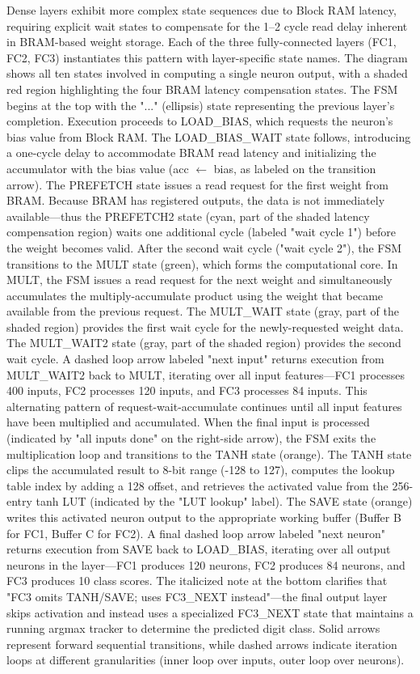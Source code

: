 \documentclass[12pt,a4paper]{report}
\begin{document}
Dense layers exhibit more complex state sequences due to Block RAM latency, requiring explicit wait states to compensate for the 1--2 cycle read delay inherent in BRAM-based weight storage. Each of the three fully-connected layers (FC1, FC2, FC3) instantiates this pattern with layer-specific state names. The diagram shows all ten states involved in computing a single neuron output, with a shaded red region highlighting the four BRAM latency compensation states. The FSM begins at the top with the "..." (ellipsis) state representing the previous layer's completion. Execution proceeds to LOAD\_BIAS, which requests the neuron's bias value from Block RAM. The LOAD\_BIAS\_WAIT state follows, introducing a one-cycle delay to accommodate BRAM read latency and initializing the accumulator with the bias value (acc $\leftarrow$ bias, as labeled on the transition arrow). The PREFETCH state issues a read request for the first weight from BRAM. Because BRAM has registered outputs, the data is not immediately available—thus the PREFETCH2 state (cyan, part of the shaded latency compensation region) waits one additional cycle (labeled "wait cycle 1") before the weight becomes valid. After the second wait cycle ("wait cycle 2"), the FSM transitions to the MULT state (green), which forms the computational core. In MULT, the FSM issues a read request for the next weight and simultaneously accumulates the multiply-accumulate product using the weight that became available from the previous request. The MULT\_WAIT state (gray, part of the shaded region) provides the first wait cycle for the newly-requested weight data. The MULT\_WAIT2 state (gray, part of the shaded region) provides the second wait cycle. A dashed loop arrow labeled "next input" returns execution from MULT\_WAIT2 back to MULT, iterating over all input features—FC1 processes 400 inputs, FC2 processes 120 inputs, and FC3 processes 84 inputs. This alternating pattern of request-wait-accumulate continues until all input features have been multiplied and accumulated. When the final input is processed (indicated by "all inputs done" on the right-side arrow), the FSM exits the multiplication loop and transitions to the TANH state (orange). The TANH state clips the accumulated result to 8-bit range (-128 to 127), computes the lookup table index by adding a 128 offset, and retrieves the activated value from the 256-entry tanh LUT (indicated by the "LUT lookup" label). The SAVE state (orange) writes this activated neuron output to the appropriate working buffer (Buffer B for FC1, Buffer C for FC2). A final dashed loop arrow labeled "next neuron" returns execution from SAVE back to LOAD\_BIAS, iterating over all output neurons in the layer—FC1 produces 120 neurons, FC2 produces 84 neurons, and FC3 produces 10 class scores. The italicized note at the bottom clarifies that "FC3 omits TANH/SAVE; uses FC3\_NEXT instead"—the final output layer skips activation and instead uses a specialized FC3\_NEXT state that maintains a running argmax tracker to determine the predicted digit class. Solid arrows represent forward sequential transitions, while dashed arrows indicate iteration loops at different granularities (inner loop over inputs, outer loop over neurons).
\end{document}
